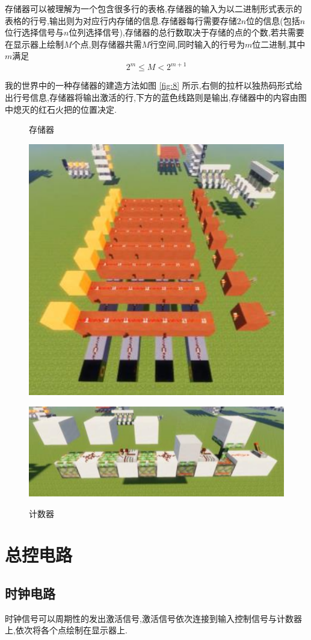 \documentclass[UTF8,12pt,punct=kaiming,fontset=none]{ctexart}
\begin{document}
存储器可以被理解为一个包含很多行的表格,存储器的输入为以二进制形式表示的表格的行号,输出则为对应行内存储的信息.存储器每行需要存储$2 n$位的信息(包括$n$位行选择信号与$n$位列选择信号),存储器的总行数取决于存储的点的个数,若共需要在显示器上绘制$M$个点,则存储器共需$M$行空间,同时输入的行号为$m$位二进制,其中$m$满足
$$2^m \leqslant M < 2^{m+1}$$

我的世界中的一种存储器的建造方法如图 \ref{fig:8} 所示,右侧的拉杆以独热码形式给出行号信息,存储器将输出激活的行,下方的蓝色线路则是输出,存储器中的内容由图中熄灭的红石火把的位置决定.

\begin{figure}[H]
    \begin{floatrow}
        \ffigbox
        {
            \caption{存储器}
            \label{fig:8}
        }
        {
            \includegraphics[width=0.5\linewidth]{figures/8.png}
        }
        \ffigbox
        {
            \caption{计数器}
            \label{fig:9}
        }
        {
            \includegraphics[width=\linewidth]{figures/9.png}
        }
    \end{floatrow}
\end{figure}

\section{总控电路}
\subsection{时钟电路}
时钟信号可以周期性的发出激活信号,激活信号依次连接到输入控制信号与计数器上,依次将各个点绘制在显示器上.
\end{document}

